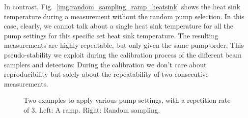 In contrast,
Fig.~\ref{img:random_sampling_ramp_heatsink}
shows the heat sink temperature
during a measurement without the random pump selection.
In this case, clearly,
we cannot talk about a single heat sink temperature
for all the pump settings
for this specific set heat sink temperature.
The resulting measurements are highly repeatable,
but only given the same pump order.
This pseudo-stability
we exploit
during the calibration process
of the different beam samplers
and detectors:
During the calibration
we don't care about reproducibility
but solely about the repeatability
of two consecutive measurements.

\begin{figure}
\centering
{}
\caption{Two examples to apply various pump settings, with a repetition rate of 3.
Left: A ramp. Right: Random sampling.}
\label{img:random_sampling}
\end{figure}

